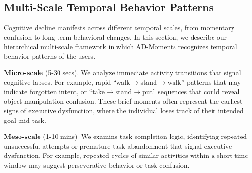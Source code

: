 \documentclass[sigconf, anonymous, 9pt, nonacm]{acmart}
\newcommand{\sys}{AD-Moments\xspace}
\begin{document}





\subsection{Multi-Scale Temporal Behavior Patterns}

Cognitive decline manifests across different temporal scales, from momentary confusion to long-term behavioral changes. 
In this section, we describe our hierarchical multi-scale framework in which \sys recognizes temporal behavior patterns of the users.

\noindent\textbf{Micro-scale} (5-30 secs). We analyze immediate activity transitions that signal cognitive lapses. For example, rapid ``walk$\rightarrow$stand$\rightarrow$walk'' patterns that may indicate forgotten intent, or ``take$\rightarrow$stand$\rightarrow$put'' sequences that could reveal object manipulation confusion.
These brief moments often represent the earliest signs of executive dysfunction, where the individual loses track of their intended goal mid-task.

\noindent\textbf{Meso-scale} (1-10 mins). We examine task completion logic, identifying repeated unsuccessful attempts or premature task abandonment that signal executive dysfunction. For example, repeated cycles of similar activities within a short time window may suggest perseverative behavior or task confusion.
\end{document}
